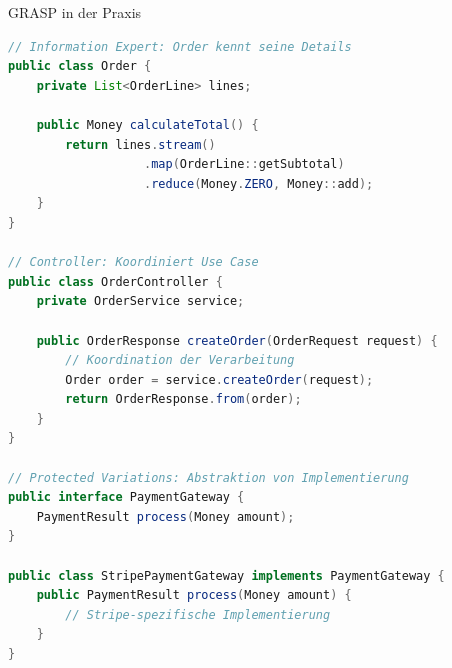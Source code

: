 \begin{example2}{GRASP in der Praxis}\\
\begin{lstlisting}[language=Java, style=base]
// Information Expert: Order kennt seine Details
public class Order {
    private List<OrderLine> lines;
    
    public Money calculateTotal() {
        return lines.stream()
                   .map(OrderLine::getSubtotal)
                   .reduce(Money.ZERO, Money::add);
    }
}

// Controller: Koordiniert Use Case
public class OrderController {
    private OrderService service;
    
    public OrderResponse createOrder(OrderRequest request) {
        // Koordination der Verarbeitung
        Order order = service.createOrder(request);
        return OrderResponse.from(order);
    }
}

// Protected Variations: Abstraktion von Implementierung
public interface PaymentGateway {
    PaymentResult process(Money amount);
}

public class StripePaymentGateway implements PaymentGateway {
    public PaymentResult process(Money amount) {
        // Stripe-spezifische Implementierung
    }
}
\end{lstlisting}
\end{example2}

